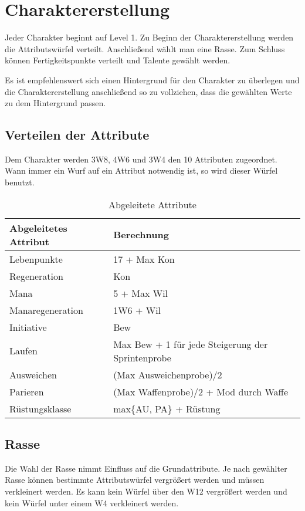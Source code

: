 \documentclass[../../Heldenanleitung2]{subfiles}
\begin{document}
\chapter{Charaktererstellung}
Jeder Charakter beginnt auf Level 1. Zu Beginn der Charaktererstellung werden die Attributswürfel verteilt. Anschließend wählt man eine Rasse. Zum Schluss können Fertigkeitspunkte verteilt und Talente gewählt werden.

Es ist empfehlenswert sich einen Hintergrund für den Charakter zu überlegen und die Charaktererstellung anschließend so zu vollziehen, dass die gewählten Werte zu dem Hintergrund passen.

\section{Verteilen der Attribute}

Dem Charakter werden 3W8, 4W6 und 3W4 den 10 Attributen zugeordnet. Wann immer ein Wurf auf ein Attribut notwendig ist, so wird dieser Würfel benutzt.
\renewcommand{\arraystretch}{1.5}
{
\begin{table}[h!]
\centering
\caption{Abgeleitete Attribute}
\label{tab:AbgeleiteteAtribute}
\begin{tabular}{|l|l|}
\hline
\textbf{Abgeleitetes Attribut} & \textbf{Berechnung}\\
\hline
Lebenpunkte & 17 + Max Kon\\
Regeneration & Kon\\
Mana & 5 + Max Wil\\
Manaregeneration & 1W6 + Wil\\
Initiative & Bew\\
Laufen & Max Bew + 1 für jede Steigerung der Sprintenprobe\\
Ausweichen & (Max Ausweichenprobe)/2\\
Parieren & (Max Waffenprobe)/2 + Mod durch Waffe\\
Rüstungsklasse & max\{AU, PA\} + Rüstung
\\
\hline
\end{tabular}
\end{table}
}

\section{Rasse}

Die Wahl der Rasse nimmt Einfluss auf die Grundattribute. Je nach gewählter Rasse können bestimmte Attributswürfel vergrößert werden und müssen verkleinert werden. Es kann kein Würfel über den W12 vergrößert werden und kein Würfel unter einem W4 verkleinert werden.
\end{document}
